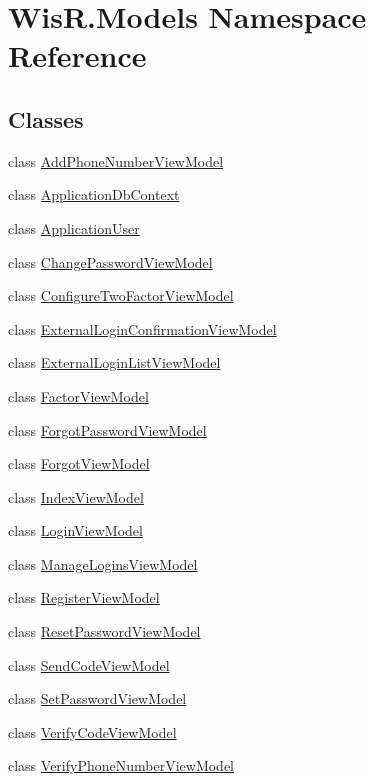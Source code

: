 \hypertarget{namespace_wis_r_1_1_models}{}\section{Wis\+R.\+Models Namespace Reference}
\label{namespace_wis_r_1_1_models}
\subsection*{Classes}
\begin{DoxyCompactItemize}
\item 
class \hyperlink{class_wis_r_1_1_models_1_1_add_phone_number_view_model}{Add\+Phone\+Number\+View\+Model}
\item 
class \hyperlink{class_wis_r_1_1_models_1_1_application_db_context}{Application\+Db\+Context}
\item 
class \hyperlink{class_wis_r_1_1_models_1_1_application_user}{Application\+User}
\item 
class \hyperlink{class_wis_r_1_1_models_1_1_change_password_view_model}{Change\+Password\+View\+Model}
\item 
class \hyperlink{class_wis_r_1_1_models_1_1_configure_two_factor_view_model}{Configure\+Two\+Factor\+View\+Model}
\item 
class \hyperlink{class_wis_r_1_1_models_1_1_external_login_confirmation_view_model}{External\+Login\+Confirmation\+View\+Model}
\item 
class \hyperlink{class_wis_r_1_1_models_1_1_external_login_list_view_model}{External\+Login\+List\+View\+Model}
\item 
class \hyperlink{class_wis_r_1_1_models_1_1_factor_view_model}{Factor\+View\+Model}
\item 
class \hyperlink{class_wis_r_1_1_models_1_1_forgot_password_view_model}{Forgot\+Password\+View\+Model}
\item 
class \hyperlink{class_wis_r_1_1_models_1_1_forgot_view_model}{Forgot\+View\+Model}
\item 
class \hyperlink{class_wis_r_1_1_models_1_1_index_view_model}{Index\+View\+Model}
\item 
class \hyperlink{class_wis_r_1_1_models_1_1_login_view_model}{Login\+View\+Model}
\item 
class \hyperlink{class_wis_r_1_1_models_1_1_manage_logins_view_model}{Manage\+Logins\+View\+Model}
\item 
class \hyperlink{class_wis_r_1_1_models_1_1_register_view_model}{Register\+View\+Model}
\item 
class \hyperlink{class_wis_r_1_1_models_1_1_reset_password_view_model}{Reset\+Password\+View\+Model}
\item 
class \hyperlink{class_wis_r_1_1_models_1_1_send_code_view_model}{Send\+Code\+View\+Model}
\item 
class \hyperlink{class_wis_r_1_1_models_1_1_set_password_view_model}{Set\+Password\+View\+Model}
\item 
class \hyperlink{class_wis_r_1_1_models_1_1_verify_code_view_model}{Verify\+Code\+View\+Model}
\item 
class \hyperlink{class_wis_r_1_1_models_1_1_verify_phone_number_view_model}{Verify\+Phone\+Number\+View\+Model}
\end{DoxyCompactItemize}
